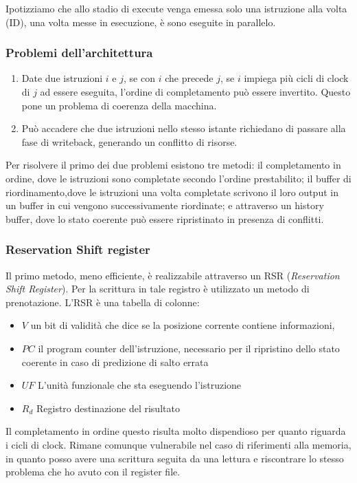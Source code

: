 \documentclass[../template]{subfiles}
\begin{document}
Ipotizziamo che allo stadio di execute venga emessa solo una istruzione alla volta (ID), una volta messe in esecuzione,
è sono eseguite in parallelo.

\subsubsection{Problemi dell'architettura}
\begin{enumerate}
    \item Date due istruzioni $i$ e $j$, se con $i$ che precede $j$, se $i$ impiega più cicli di clock di $j$ ad essere eseguita,
        l'ordine di completamento può essere invertito. Questo pone un problema di coerenza della macchina.
    \item Può accadere che due istruzioni nello stesso istante richiedano di passare alla fase di writeback, generando
        un conflitto di risorse.
\end{enumerate}

Per risolvere il primo dei due problemi esistono tre metodi: il completamento in ordine, dove le istruzioni sono
completate secondo l'ordine prestabilito; il buffer di riordinamento,dove le istruzioni una volta completate scrivono il
loro output in un buffer in cui vengono successivamente riordinate; e attraverso un history buffer, dove lo stato
coerente può essere ripristinato in presenza di conflitti.

\subsubsection{Reservation Shift register}
Il primo metodo, meno efficiente, è realizzabile attraverso un RSR (\textit{Reservation Shift Register}). Per la
scrittura in tale registro è utilizzato un metodo di prenotazione.
L'RSR è una tabella di colonne:
\begin{itemize}
    \item $V$ un bit di validità che dice se la posizione corrente contiene informazioni,
    \item $PC$ il program counter dell'istruzione, necessario per il ripristino dello stato coerente in caso di
        predizione di salto errata
    \item $UF$ L'unità funzionale che sta eseguendo l'istruzione
    \item $R_d$ Registro destinazione del risultato
\end{itemize}
Il completamento in ordine questo risulta molto dispendioso per quanto riguarda i cicli di clock. Rimane comunque
vulnerabile nel caso di riferimenti alla memoria, in quanto posso avere una scrittura seguita da una lettura e
riscontrare lo stesso problema che ho avuto con il register file.
\end{document}
